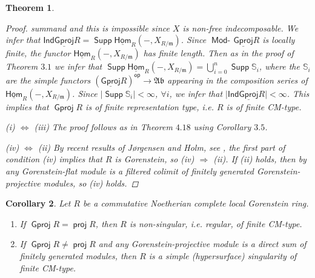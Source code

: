 \documentclass[oneside, a4paper,reqno]{amsart}
\numberwithin{equation}{section}
\newtheorem{thm}{Theorem}[section]
\newtheorem{cor}[thm]{Corollary}
\theoremstyle{definition}
\begin{document}
\begin{thm}
\begin{proof}
summand and this is impossible since $X$ is non-free indecomposable.
We infer that $\mathsf{Ind}{\operatorname{\underline{\mathsf{Gproj}}}\nolimits} R =
\operatorname*{\mathsf{Supp}}\operatorname*{\underline{\mathsf{Hom}}}_{R}(-,X_{R/\mathfrak{m}})$. Since $\operatorname*{\mathsf{Mod}-\!}{\operatorname{\underline{\mathsf{Gproj}}}\nolimits} R$ is
locally finite, the functor $\operatorname*{\underline{\mathsf{Hom}}}_{R}(-,X_{R/\mathfrak{m}})$ has
finite length. Then as in the proof of Theorem $3.1$ we infer that
$\operatorname*{\mathsf{Supp}}\operatorname*{\underline{\mathsf{Hom}}}_{R}(-,X_{R/\mathfrak{m}}) =
\bigcup^{n}_{i=0}\operatorname*{\mathsf{Supp}}\mathbb S_{i}$, where the $\mathbb S_{i}$ are
the simple functors $({\operatorname{\underline{\mathsf{Gproj}}}\nolimits} R)^\operatorname*{\mathsf{op}} {\longrightarrow} {\mathfrak{Ab}}$ appearing in the
composition series of $\operatorname*{\underline{\mathsf{Hom}}}_{R}(-,X_{R/\mathfrak{m}})$. Since
$\vert \operatorname*{\mathsf{Supp}} \mathbb S_{i}\rvert < \infty$, $\forall i$, we infer
that $\vert\mathsf{Ind}{\operatorname{\underline{\mathsf{Gproj}}}\nolimits} R\rvert < \infty$. This  implies that
${\operatorname{\mathsf{Gproj}}\nolimits} R$ is of finite representation type, i.e. $R$ is of finite
CM-type.

(i) $\Leftrightarrow$ (iii) The proof follows as in Theorem $4.18$
 using Corollary $3.5$.

(iv) $\Leftrightarrow$ (ii) By recent results of J{\o}rgensen and Holm,
see \cite[Theorem 2.7]{HJ}, the first part of condition (iv) implies
that $R$ is Gorenstein, so (iv) $\Rightarrow$ (ii). If (ii) holds,
then by \cite[Theorem 10.3.8]{EJ} any Gorenstein-flat module is a
filtered colimit of finitely generated Gorenstein-projective
modules, so (iv) holds.
\end{proof}
\end{thm}

\begin{cor} Let $R$ be a commutative Noetherian complete local Gorenstein
ring.
\begin{enumerate}
\item If ${\operatorname{\mathsf{Gproj}}\nolimits} R = \operatorname*{\mathsf{proj}} R$, then $R$ is non-singular, i.e. regular, of finite
CM-type.
\item If  ${\operatorname{\mathsf{Gproj}}\nolimits} R \neq \operatorname*{\mathsf{proj}} R$ and any
Gorenstein-projective module is a direct sum of finitely generated
modules,  then $R$ is a simple (hypersurface) singularity of finite CM-type.
\end{enumerate}
\end{cor}
\end{document}
